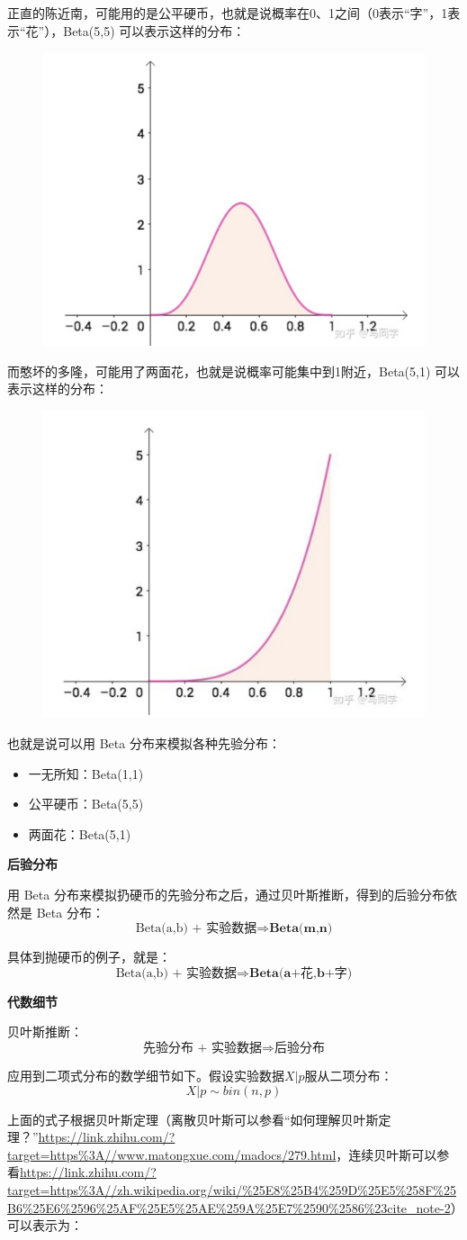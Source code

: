 \documentclass[12pt]{article}
\begin{document}
正直的陈近南，可能用的是公平硬币，也就是说概率在0、1之间（0表示“字”，1表示“花”），Beta(5,5) 可以表示这样的分布：
\begin{figure}[H]
  \centering
  \includegraphics[width=.3\textwidth]{fig/Beta_Distribution_Ma_Example_3.png} 
\end{figure}

而憨坏的多隆，可能用了两面花，也就是说概率可能集中到1附近，Beta(5,1) 可以表示这样的分布：
\begin{figure}[H]
  \centering
  \includegraphics[width=.3\textwidth]{fig/Beta_Distribution_Ma_Example_4.png} 
\end{figure}

也就是说可以用 Beta 分布来模拟各种先验分布：
\begin{itemize}
    \item 一无所知：Beta(1,1)
    \item 公平硬币：Beta(5,5)
    \item 两面花：Beta(5,1)
\end{itemize}

\textbf{后验分布}

用 Beta 分布来模拟扔硬币的先验分布之后，通过贝叶斯推断，得到的后验分布依然是 Beta 分布：
$$
\text{Beta(a,b) + 实验数据} \Rightarrow \textbf{Beta(m,n)} 
$$

具体到抛硬币的例子，就是：
$$
\text{Beta(a,b) + 实验数据} \Rightarrow \textbf{Beta(a+花,b+字)} 
$$

\textbf{代数细节}

贝叶斯推断：
$$
\text{先验分布 + 实验数据} \Rightarrow \textbf{后验分布} 
$$

应用到二项式分布的数学细节如下。假设实验数据$X|p$服从二项分布：
$$
X|p \sim bin(n,p)
$$

上面的式子根据贝叶斯定理（离散贝叶斯可以参看“如何理解贝叶斯定理？”\url{https://link.zhihu.com/?target=https%3A//www.matongxue.com/madocs/279.html}，连续贝叶斯可以参看\url{https://link.zhihu.com/?target=https%3A//zh.wikipedia.org/wiki/%25E8%25B4%259D%25E5%258F%25B6%25E6%2596%25AF%25E5%25AE%259A%25E7%2590%2586%23cite_note-2}）可以表示为：
\end{document}
